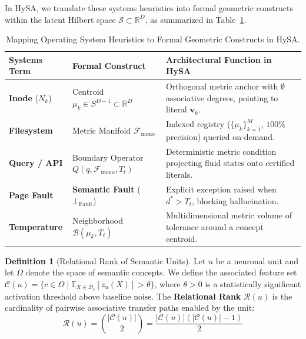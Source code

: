 \documentclass[10pt,twocolumn]{article}
\theoremstyle{definition}
\newtheorem{definition}{Definition}
\begin{document}
In HySA, we translate these systems heuristics into formal geometric constructs within the latent Hilbert space $\mathcal{S} \subset \mathbb{R}^D$, as summarized in Table~\ref{tab:systems_mapping}.

\begin{table}[t]
\centering
\caption{Mapping Operating System Heuristics to Formal Geometric Constructs in HySA.}
\label{tab:systems_mapping}
\vspace{0.12cm}
\scriptsize
\setlength{\tabcolsep}{2.0pt}
\begin{tabular}{@{}p{1.9cm}p{2.3cm}p{3.4cm}@{}}
\toprule
\textbf{Systems Term} & \textbf{Formal Construct} & \textbf{Architectural Function in HySA} \\ \midrule
\textbf{Inode} ($N_k$) & Centroid $\mu_k \in S^{D-1} \subset \mathbb{R}^D$ & Orthogonal metric anchor with $\emptyset$ associative degrees, pointing to literal $\mathbf{v}_k$. \\[3pt]
\textbf{Filesystem} & Metric Manifold $\mathcal{F}_{\mathrm{mono}}$ & Indexed registry ($\{\mu_k\}_{k=1}^M$, $100\%$ precision) queried on-demand. \\[3pt]
\textbf{Query / API} & Boundary Operator $Q(q, \mathcal{F}_{\mathrm{mono}}, T_t)$ & Deterministic metric condition projecting fluid states onto certified literals. \\[3pt]
\textbf{Page Fault} & \textbf{Semantic Fault} ($\bot_{\mathrm{Fault}}$) & Explicit exception raised when $d^* > T_t$, blocking hallucination. \\[3pt]
\textbf{Temperature} & Neighborhood $\mathcal{B}(\mu_k, T_t)$ & Multidimensional metric volume of tolerance around a concept centroid. \\ \bottomrule
\end{tabular}
\end{table}

\begin{definition}[Relational Rank of Semantic Units]
Let $u$ be a neuronal unit and let $\Omega$ denote the space of semantic concepts. We define the associated feature set $\mathcal{C}(u) = \{c \in \Omega \mid \mathbb{E}_{X \in \mathcal{D}_c}[z_u(X)] > \theta\}$, where $\theta > 0$ is a statistically significant activation threshold above baseline noise. The \textbf{Relational Rank} $\mathcal{R}(u)$ is the cardinality of pairwise associative transfer paths enabled by the unit:
\begin{equation}
    \mathcal{R}(u) = \binom{|\mathcal{C}(u)|}{2} = \frac{|\mathcal{C}(u)| (|\mathcal{C}(u)| - 1)}{2}
\end{equation}
\end{definition}
\end{document}
